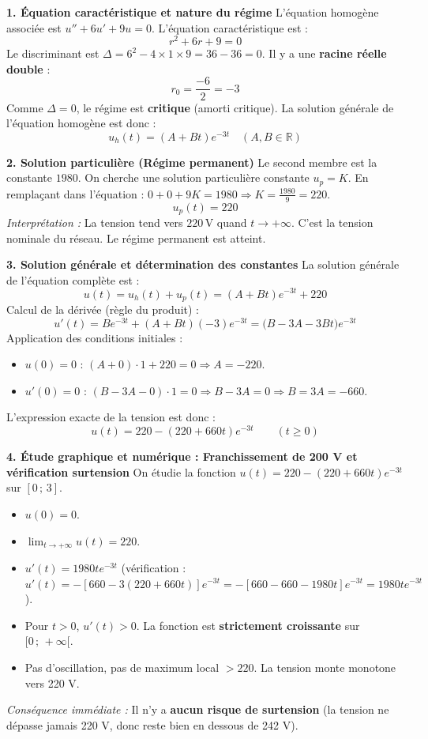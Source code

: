 \documentclass[11pt]{article}
\newcounter{popsec}
\newcounter{popsub}
\newcommand{\courssub}[1]{%
  \stepcounter{popsub}%
  \par\vspace{9pt}\noindent{\popxbold\fontsize{11.5}{13}\selectfont\color{popink}{\color{poporange}\thepopsec.\thepopsub}\hspace{6pt}#1}\par\nopagebreak\vspace{4pt}
}
\begin{document}
\courssub{Démarche et corrigé commenté}
\begin{exoresolu}
\noindent \textbf{1. Équation caractéristique et nature du régime}
L'équation homogène associée est $u'' + 6u' + 9u = 0$.
L'équation caractéristique est :
\[
r^2 + 6r + 9 = 0
\]
Le discriminant est $\Delta = 6^2 - 4 \times 1 \times 9 = 36 - 36 = 0$.
Il y a une \textbf{racine réelle double} :
\[
r_0 = \frac{-6}{2} = -3
\]
Comme $\Delta = 0$, le régime est \textbf{critique} (amorti critique).
La solution générale de l'équation homogène est donc :
\[
u_h(t) = (A + B t) e^{-3t} \quad (A, B \in \mathbb{R})
\]

\medskip
\noindent \textbf{2. Solution particulière (Régime permanent)}
Le second membre est la constante $1980$. On cherche une solution particulière constante $u_p = K$.
En remplaçant dans l'équation : $0 + 0 + 9K = 1980 \Rightarrow K = \frac{1980}{9} = 220$.
\[
u_p(t) = 220
\]
\emph{Interprétation :} La tension tend vers $220\,\text{V}$ quand $t \to +\infty$. C'est la tension nominale du réseau. Le régime permanent est atteint.

\medskip
\noindent \textbf{3. Solution générale et détermination des constantes}
La solution générale de l'équation complète est :
\[
u(t) = u_h(t) + u_p(t) = (A + B t) e^{-3t} + 220
\]
Calcul de la dérivée (règle du produit) :
\[
u'(t) = B e^{-3t} + (A + B t)(-3) e^{-3t} = \bigl( B - 3A - 3B t \bigr) e^{-3t}
\]
Application des conditions initiales :
\begin{itemize}
    \item $u(0) = 0$ : $(A + 0) \cdot 1 + 220 = 0 \Rightarrow A = -220$.
    \item $u'(0) = 0$ : $(B - 3A - 0) \cdot 1 = 0 \Rightarrow B - 3A = 0 \Rightarrow B = 3A = -660$.
\end{itemize}
L'expression exacte de la tension est donc :
\[
\boxed{u(t) = 220 - (220 + 660 t) e^{-3t} \qquad (t \ge 0)}
\]

\medskip
\noindent \textbf{4. Étude graphique et numérique : Franchissement de 200 V et vérification surtension}
On étudie la fonction $u(t) = 220 - (220 + 660t)e^{-3t}$ sur $[0\,;\,3]$.
\begin{itemize}
    \item $u(0) = 0$.
    \item $\lim_{t\to+\infty} u(t) = 220$.
    \item $u'(t) = 1980 t e^{-3t}$ (vérification : $u'(t) = -[660 - 3(220+660t)]e^{-3t} = -[660-660-1980t]e^{-3t} = 1980 t e^{-3t}$).
    \item Pour $t > 0$, $u'(t) > 0$. La fonction est \textbf{strictement croissante} sur $[0\,;\,+\infty[$.
    \item Pas d'oscillation, pas de maximum local $> 220$. La tension monte monotone vers 220 V.
\end{itemize}
\emph{Conséquence immédiate :} Il n'y a \textbf{aucun risque de surtension} (la tension ne dépasse jamais 220 V, donc reste bien en dessous de 242 V).


\end{exoresolu}
\end{document}
